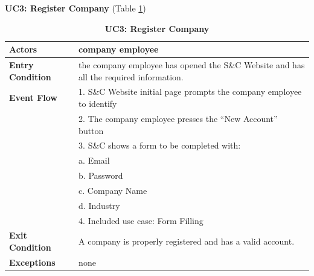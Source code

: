 \textbf{UC3: Register Company }(Table \ref{tab:UC3})
\begin{table}[H]
\centering
\caption{\textbf{UC3: Register Company}}
\label{tab:UC3}
\begin{tabularx}{\textwidth}{|X|X|}
\hline
\textbf{Actors}           & company employee                                         \\ \hline
\textbf{Entry Condition}   & the company employee has opened the S\&C Website and has all the required information. \\ \hline
\textbf{Event Flow}        & 1. S\&C Website initial page prompts the company employee to identify  \\
                           & 2. The company employee presses the “New Account” button             \\
                           & 3. S\&C shows a form to be completed with:                          \\
                           & \hspace{1em} a. Email                                             \\
                           & \hspace{1em} b. Password                                          \\
                           & \hspace{1em} c. Company Name                                      \\
                           & \hspace{1em} d. Industry                                          \\
                           & 4. Included use case: Form Filling                                 \\ \hline
\textbf{Exit Condition}    & A company is properly registered and has a valid account.        \\ \hline
\textbf{Exceptions}        & none                                                           \\ \hline
\end{tabularx}
\end{table}

